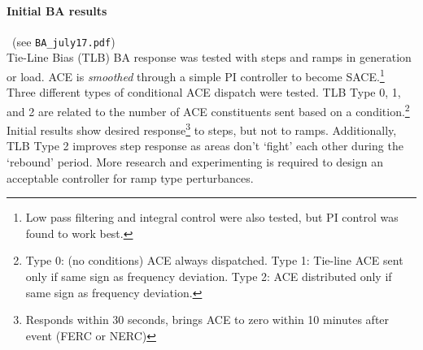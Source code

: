 \documentclass[12pt]{article}
\begin{document}
\paragraph{Initial BA results} \ (see \verb|BA_july17.pdf|)\\
Tie-Line Bias (TLB) BA response was tested with steps and ramps in generation or load. ACE is \emph{smoothed} through a simple PI controller to become SACE.\footnote{Low pass filtering and integral control were also tested, but PI control was found to work best.}
Three different types of conditional ACE dispatch were tested. TLB Type 0, 1, and 2 are related to the number of ACE constituents sent based on a condition.\footnote{Type 0: (no conditions) ACE always dispatched. Type 1: Tie-line ACE sent only if same sign as frequency deviation. Type 2:  ACE distributed only if same sign as frequency deviation.}\\

Initial results show desired response\footnote{Responds within 30 seconds, brings ACE to zero within 10 minutes after event (FERC or NERC)} to steps, but not to ramps. %
Additionally, TLB Type 2 improves step response as areas don't `fight' each other during the `rebound' period. More research and experimenting is required to design an acceptable controller for ramp type perturbances. %
\end{document}
